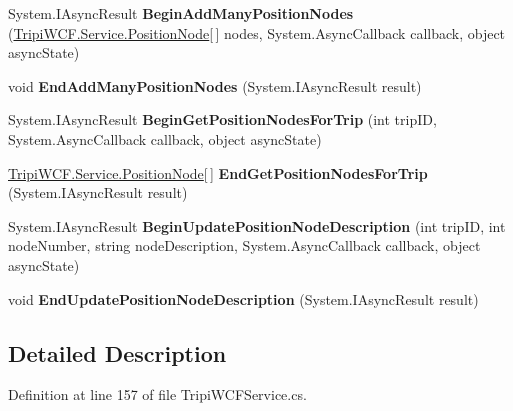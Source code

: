 \begin{DoxyCompactItemize}
\item 
\hypertarget{interface_i_trip_service_ab2930b15213c89efc21d149687c5a041}{
System.IAsyncResult {\bfseries BeginAddManyPositionNodes} (\hyperlink{class_tripi_w_c_f_1_1_service_1_1_position_node}{TripiWCF.Service.PositionNode}\mbox{[}$\,$\mbox{]} nodes, System.AsyncCallback callback, object asyncState)}
\label{interface_i_trip_service_ab2930b15213c89efc21d149687c5a041}

\item 
\hypertarget{interface_i_trip_service_a57e8dd6c318566368660f4ec1d80c06e}{
void {\bfseries EndAddManyPositionNodes} (System.IAsyncResult result)}
\label{interface_i_trip_service_a57e8dd6c318566368660f4ec1d80c06e}

\item 
\hypertarget{interface_i_trip_service_af59f015a6ee2bcdae06759d153a0f87d}{
System.IAsyncResult {\bfseries BeginGetPositionNodesForTrip} (int tripID, System.AsyncCallback callback, object asyncState)}
\label{interface_i_trip_service_af59f015a6ee2bcdae06759d153a0f87d}

\item 
\hypertarget{interface_i_trip_service_a6f522a89afc016164069f8c983d6b637}{
\hyperlink{class_tripi_w_c_f_1_1_service_1_1_position_node}{TripiWCF.Service.PositionNode}\mbox{[}$\,$\mbox{]} {\bfseries EndGetPositionNodesForTrip} (System.IAsyncResult result)}
\label{interface_i_trip_service_a6f522a89afc016164069f8c983d6b637}

\item 
\hypertarget{interface_i_trip_service_a25bc5f482b3f730ed3dd65962ca45e56}{
System.IAsyncResult {\bfseries BeginUpdatePositionNodeDescription} (int tripID, int nodeNumber, string nodeDescription, System.AsyncCallback callback, object asyncState)}
\label{interface_i_trip_service_a25bc5f482b3f730ed3dd65962ca45e56}

\item 
\hypertarget{interface_i_trip_service_a56343a5afbaa09e01eb3c01eccc5eee7}{
void {\bfseries EndUpdatePositionNodeDescription} (System.IAsyncResult result)}
\label{interface_i_trip_service_a56343a5afbaa09e01eb3c01eccc5eee7}

\end{DoxyCompactItemize}


\subsection{Detailed Description}


Definition at line 157 of file TripiWCFService.cs.

